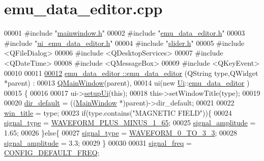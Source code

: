 \hypertarget{a00093_source}{\section{emu\+\_\+data\+\_\+editor.\+cpp}
\label{a00093_source}
}

\begin{DoxyCode}
00001 \textcolor{preprocessor}{#include "\hyperlink{a00110}{mainwindow.h}"}
00002 \textcolor{preprocessor}{#include "\hyperlink{a00094}{emu\_data\_editor.h}"}
00003 \textcolor{preprocessor}{#include "\hyperlink{a00138}{ui\_emu\_data\_editor.h}"}
00004 \textcolor{preprocessor}{#include "\hyperlink{a00078}{slider.h}"}
00005 \textcolor{preprocessor}{#include <QFileDialog>}
00006 \textcolor{preprocessor}{#include <QDesktopServices>}
00007 \textcolor{preprocessor}{#include <QDateTime>}
00008 \textcolor{preprocessor}{#include <QMessageBox>}
00009 \textcolor{preprocessor}{#include <QKeyEvent>}
00010 
00011 
\hypertarget{a00093_source_l00012}{}\hyperlink{a00008_ace57d3f7e3dd136290777006218abca9}{00012} \hyperlink{a00008_ace57d3f7e3dd136290777006218abca9}{emu\_data\_editor ::emu\_data\_editor} (QString type,QWidget *parent) :
00013     \hyperlink{a00058}{QMainWindow}(parent),
00014     ui(new \hyperlink{a00145}{Ui}::\hyperlink{a00008}{emu\_data\_editor} )
00015 \{
00016 
00017     ui->\hyperlink{a00079_a33af8ac054888d9cc0833b699028b690}{setupUi}(\textcolor{keyword}{this});
00018     this->setWindowTitle(type);
00019 
00020     \hyperlink{a00008_aa55b7d8008e31fcc971692b493e7cf34}{dir\_default} = ((\hyperlink{a00017}{MainWindow} *)parent)->dir\_default;
00021 
00022     \hyperlink{a00008_a2abdde44f37258778dcc571e8cc7ed1a}{win\_title} = type;
00023     \textcolor{keywordflow}{if}(type.contains(\textcolor{stringliteral}{"MAGNETIC FIELD"}))\{
00024         \hyperlink{a00008_a070edaec5aee6ba1f5a6866bc32c8ce4}{signal\_type} = \hyperlink{a00090_a0923d3b365a36e1e8c401cec964aa36f}{WAVEFORM\_PLUS\_MINUS\_1\_65};
00025         \hyperlink{a00008_a73dabe63bd74afe2776e8136211dc36e}{signal\_amplitude} = 1.65;
00026     \}\textcolor{keywordflow}{else}\{
00027         \hyperlink{a00008_a070edaec5aee6ba1f5a6866bc32c8ce4}{signal\_type} = \hyperlink{a00090_ae18fed2471b16a8516d721ff60671dd9}{WAVEFORM\_0\_TO\_3\_3};
00028         \hyperlink{a00008_a73dabe63bd74afe2776e8136211dc36e}{signal\_amplitude} = 3.3;
00029     \}
00030 
00031     \hyperlink{a00008_a67039999d520fc483fab521fae5ddde4}{signal\_freq}      = \hyperlink{a00086_a985a153b3edd3d7d638137ae0b9e5e67}{CONFIG\_DEFAULT\_FREQ};

\end{DoxyCode}
